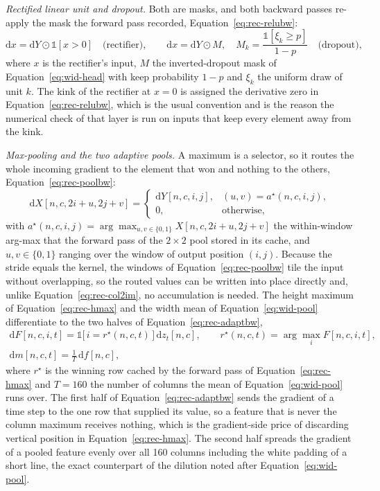 \emph{Rectified linear unit and dropout.} Both are masks, and both backward passes re-apply the mask the forward pass recorded, Equation~\ref{eq:rec-relubw}:
\begin{equation}
\mathrm dx=\mathrm dY\odot\mathbb 1[x>0]\quad\text{(rectifier)},\qquad
\mathrm dx=\mathrm dY\odot M,\quad M_k=\frac{\mathbb 1[\xi_k\ge p]}{1-p}\quad\text{(dropout)},
\label{eq:rec-relubw}
\end{equation}
where $x$ is the rectifier's input, $M$ the inverted-dropout mask of Equation~\ref{eq:wid-head} with keep probability $1-p$ and $\xi_k$ the uniform draw of unit $k$.
The kink of the rectifier at $x=0$ is assigned the derivative zero in Equation~\ref{eq:rec-relubw}, which is the usual convention and is the reason the numerical check of that layer is run on inputs that keep every element away from the kink.

\emph{Max-pooling and the two adaptive pools.} A maximum is a selector, so it routes the whole incoming gradient to the element that won and nothing to the others, Equation~\ref{eq:rec-poolbw}:
\begin{equation}
\mathrm dX[n,c,2i+u,2j+v]=\begin{cases}\mathrm dY[n,c,i,j], & (u,v)=a^{\star}(n,c,i,j),\\[2pt] 0,&\text{otherwise,}\end{cases}
\label{eq:rec-poolbw}
\end{equation}
with $a^{\star}(n,c,i,j)=\arg\max_{u,v\in\{0,1\}}X[n,c,2i+u,2j+v]$ the within-window arg-max that the forward pass of the $2\times2$ pool stored in its cache, and $u,v\in\{0,1\}$ ranging over the window of output position $(i,j)$.
Because the stride equals the kernel, the windows of Equation~\ref{eq:rec-poolbw} tile the input without overlapping, so the routed values can be written into place directly and, unlike Equation~\ref{eq:rec-col2im}, no accumulation is needed.
The height maximum of Equation~\ref{eq:rec-hmax} and the width mean of Equation~\ref{eq:wid-pool} differentiate to the two halves of Equation~\ref{eq:rec-adaptbw},
\begin{equation}
\begin{gathered}
\mathrm dF[n,c,i,t]=\mathbb 1\bigl[\,i=r^{\star}(n,c,t)\,\bigr]\,\mathrm dz_t[n,c],\qquad r^{\star}(n,c,t)=\arg\max_iF[n,c,i,t],\\
\mathrm dm[n,c,t]=\frac{1}{T}\,\mathrm df[n,c],
\end{gathered}
\label{eq:rec-adaptbw}
\end{equation}
where $r^{\star}$ is the winning row cached by the forward pass of Equation~\ref{eq:rec-hmax} and $T=160$ the number of columns the mean of Equation~\ref{eq:wid-pool} runs over.
The first half of Equation~\ref{eq:rec-adaptbw} sends the gradient of a time step to the one row that supplied its value, so a feature that is never the column maximum receives nothing, which is the gradient-side price of discarding vertical position in Equation~\ref{eq:rec-hmax}.
The second half spreads the gradient of a pooled feature evenly over all 160 columns including the white padding of a short line, the exact counterpart of the dilution noted after Equation~\ref{eq:wid-pool}.

